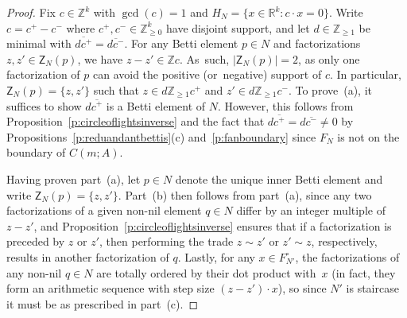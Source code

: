 \documentclass[ALCO, Unicode]{cedram}
\newcommand\ZZ{\mathbb{Z}}
\newcommand\RR{\mathbb{R}}
\begin{document}
\begin{proof}
Fix $c \in \ZZ^k$ with $\gcd(c) = 1$ and $H_N = \{x \in \RR^k : c \cdot x = 0\}$.  Write $c = c^+ - c^-$ where $c^+, c^- \in \ZZ_{\ge 0}^k$ have disjoint support, and let $d \in \ZZ_{\ge 1}$ be minimal with $\overline{d c^+} = \overline{d c^-}$.  
For any Betti element $p \in N$ and factorizations $z, z' \in \mathsf Z_N(p)$, we have $z - z' \in \ZZ c$.  As~such, $|\mathsf Z_N(p)| = 2$, as only one factorization of $p$ can avoid the positive (or~negative) support of $c$.  In particular, $\mathsf Z_N(p) = \{z, z'\}$ such that $z \in d \ZZ_{\ge 1} c^+$ and $z' \in d \ZZ_{\ge 1} c^-$.  To prove~(a), it suffices to show $d \overline{c^+}$ is a Betti element of $N$.  However, this follows from Proposition~\ref{p:circleoflightsinverse} and the fact that $d \overline{c^+} = d \overline{c^-} \ne 0$ by Propositions~\ref{p:reduandantbettis}(c) and~\ref{p:fanboundary} since $F_N$ is not on the boundary of $C(m; A)$.  

Having proven part~(a), let $p \in N$ denote the unique inner Betti element and write $\mathsf Z_N(p) = \{z,z'\}$.  Part~(b) then follows from part~(a), since any two factorizations of a given non-nil element $q \in N$ differ by an integer multiple of $z - z'$, and Proposition~\ref{p:circleoflightsinverse} ensures that if a factorization is preceded by $z$ or $z'$, then performing the trade $z \sim z'$ or $z' \sim z$, respectively, results in another factorization of $q$.  Lastly, for any $x \in F_{N'}^\circ$, the factorizations of any non-nil $q \in N$ are totally ordered by their dot product with~$x$ (in fact, they form an arithmetic sequence with step size $(z - z') \cdot x$), so since $N'$ is staircase it must be as prescribed in part~(c).  
\end{proof}
\end{document}
